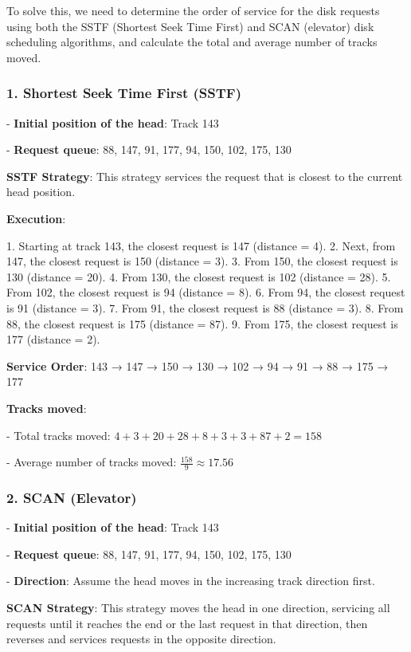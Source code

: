 \documentclass[a4paper]{book}
\begin{document}
To solve this, we need to determine the order of service for the disk requests using both the SSTF (Shortest Seek Time First) and SCAN (elevator) disk scheduling algorithms, and calculate the total and average number of tracks moved.

\subsubsection{1. \textbf{Shortest Seek Time First (SSTF)}}

- \textbf{Initial position of the head}: Track 143

- \textbf{Request queue}: 88, 147, 91, 177, 94, 150, 102, 175, 130


\textbf{SSTF Strategy}:
This strategy services the request that is closest to the current head position.

\textbf{Execution}:

1. Starting at track 143, the closest request is 147 (distance = 4).
2. Next, from 147, the closest request is 150 (distance = 3).
3. From 150, the closest request is 130 (distance = 20).
4. From 130, the closest request is 102 (distance = 28).
5. From 102, the closest request is 94 (distance = 8).
6. From 94, the closest request is 91 (distance = 3).
7. From 91, the closest request is 88 (distance = 3).
8. From 88, the closest request is 175 (distance = 87).
9. From 175, the closest request is 177 (distance = 2).

\textbf{Service Order}: 143 → 147 → 150 → 130 → 102 → 94 → 91 → 88 → 175 → 177

\textbf{Tracks moved}:

- Total tracks moved: \(4 + 3 + 20 + 28 + 8 + 3 + 3 + 87 + 2 = 158\)

- Average number of tracks moved: \(\frac{158}{9} \approx 17.56\)


\subsubsection{2. \textbf{SCAN (Elevator)}}

- \textbf{Initial position of the head}: Track 143

- \textbf{Request queue}: 88, 147, 91, 177, 94, 150, 102, 175, 130

- \textbf{Direction}: Assume the head moves in the increasing track direction first.


\textbf{SCAN Strategy}:
This strategy moves the head in one direction, servicing all requests until it reaches the end or the last request in that direction, then reverses and services requests in the opposite direction.
\end{document}
